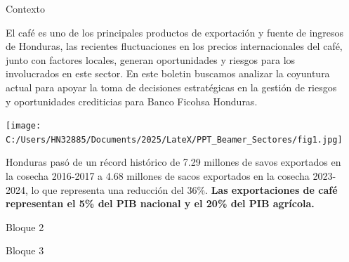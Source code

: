 \documentclass[final]{beamer}
\newlength{\sepwidth}
\newlength{\colwidth}
\newcommand{\separatorcolumn}{\begin{column}{\sepwidth}\end{column}}
\begin{document}
\begin{frame}[t]
\begin{columns}[t]
\separatorcolumn

\begin{column}{\colwidth}

  \begin{block}{Contexto}

    El café es uno de los principales productos de exportación y fuente de ingresos de Honduras, las recientes fluctuaciones en los precios internacionales del café, junto con factores locales, generan oportunidades y riesgos para los involucrados en este sector. En este boletin buscamos analizar
    la coyuntura actual para apoyar la toma de decisiones estratégicas en la gestión de riesgos y oportunidades crediticias para Banco Ficohsa Honduras. 
   
   \begin{center}
    \texttt{[image: C:/Users/HN32885/Documents/2025/LateX/PPT\_Beamer\_Sectores/fig1.jpg]}
   \end{center}

Honduras pasó de un récord histórico de 7.29 millones de savos exportados en la cosecha 2016-2017 a 4.68 millones de sacos exportados en la cosecha 2023-2024, lo que representa una reducción del 36\%. \textbf{Las exportaciones de café representan el 5\% del PIB nacional y el 20\% del PIB agrícola.} 

  \end{block}
  \begin{block}{Bloque 2}

   

  \end{block}
  \begin{alertblock}{Bloque 3}



  \end{alertblock}

\end{column}


\end{columns}
\end{frame}
\end{document}
